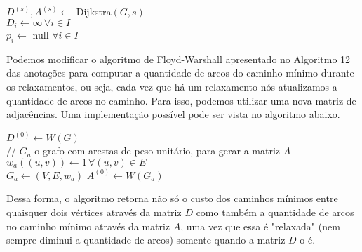 \documentclass[a4paper]{report}
\begin{document}
\begin{algorithm}
    $D^{(s)}, A^{(s)} \gets $ Dijkstra$\left( G, s \right) $ \\

    $D_i \gets \infty\, \forall i \in I$ \\
    $p_i \gets $ null $\forall i \in I$ \\
\end{algorithm}


Podemos modificar o algoritmo de Floyd-Warshall apresentado no Algoritmo 12 das anotações para computar a quantidade de arcos do caminho mínimo durante os relaxamentos, ou seja, cada vez que há um relaxamento nós atualizamos a quantidade de arcos no caminho. Para isso, podemos utilizar uma nova matriz de adjacências. Uma implementação possível pode ser vista no algoritmo abaixo.

\begin{algorithm}[H] 
    $D^{(0)} \gets  W\left( G  \right) $\\

    // $G_a$ o grafo com arestas de peso unitário, para gerar a matriz $A$ \\
    $w_a\left( \left( u,v \right)  \right) \gets 1\, \forall \left( u,v \right) \in E$ \\
    $G_a \gets \left( V, E, w_a \right) $
    $A^{(0)} \gets W\left( G_a \right) $ \\


\end{algorithm}

Dessa forma, o algoritmo retorna não só o custo dos caminhos mínimos entre quaisquer dois vértices através da matriz $D$ como também a quantidade de arcos no caminho mínimo através da matriz $A$, uma vez que essa é "relaxada" (nem sempre diminui a quantidade de arcos) somente quando a matriz $D$ o é.
\end{document}
